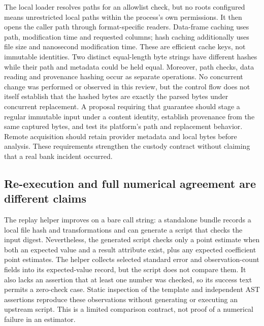 The local loader resolves paths for an allowlist check, but no roots configured
means unrestricted local paths within the process's own permissions. It then
opens the caller path through format-specific readers. Data-frame caching uses
path, modification time and requested columns; hash caching additionally uses
file size and nanosecond modification time. These are efficient cache keys,
not immutable identities. Two distinct equal-length byte strings have different
hashes while their path and metadata could be held equal. Moreover, path checks,
data reading and provenance hashing occur as separate operations. No concurrent
change was performed or observed in this review, but the control flow does not
itself establish that the hashed bytes are exactly the parsed bytes under
concurrent replacement. A proposal requiring that guarantee should stage a
regular immutable input under a content identity, establish provenance from
the same captured bytes, and test its platform's path and replacement behavior.
Remote acquisition should retain provider metadata and local bytes before
analysis. These requirements strengthen the custody contract without claiming
that a real bank incident occurred.
\citep{exec23_statspai_runtime,exec23_statspai_runtime_reference}

\subsection{Re-execution and full numerical agreement are different claims}
\label{exec23:statspai-runtime-replay}
The replay helper improves on a bare call string: a standalone bundle records
a local file hash and transformations and can generate a script that checks
the input digest. Nevertheless, the generated script checks only a point
estimate when both an expected value and a result attribute exist, plus any
expected coefficient point estimates. The helper collects selected standard
error and observation-count fields into its expected-value record, but the
script does not compare them. It also lacks an assertion that at least one
number was checked, so its success text permits a zero-check case. Static
inspection of the template and independent AST assertions reproduce these
observations without generating or executing an upstream script.
This is a limited comparison contract, not proof of a numerical failure in
an estimator.
\citep{exec23_statspai_runtime,exec23_statspai_runtime_reference}

